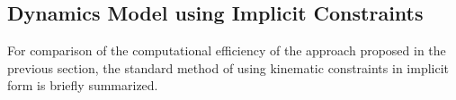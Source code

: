 \documentclass{svproc}
\begin{document}
%


\subsection{Dynamics Model using Implicit Constraints}
\label{sec:DynamicsImpl}

For comparison of the computational efficiency of the approach proposed in the previous section, the standard method \cite{NakamuraGho1989,ParkChoPlo1999,KhalilBen1995,SaminFis2013} of using kinematic constraints in implicit form is briefly summarized.
\end{document}
